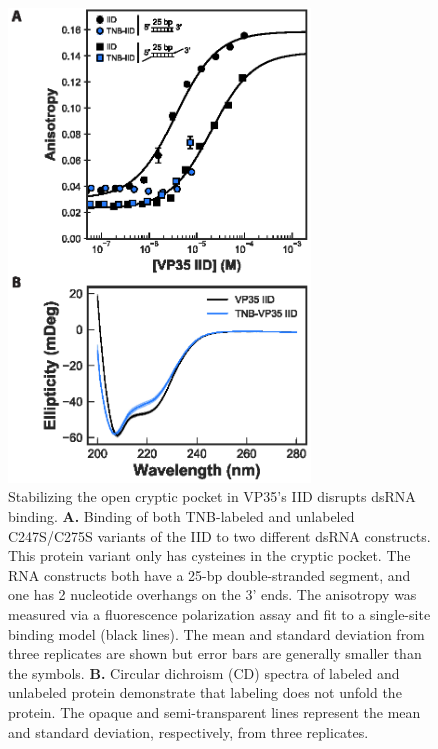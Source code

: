 \documentclass[../main.tex]{subfiles}
\begin{document}
        \begin{figure}[!htb] %
            \centering
            \includegraphics[width=3.16in]{ch5-fig5.eps}
            \caption[Stabilizing the open cryptic pocket in VP35’s IID disrupts dsRNA binding.]
                {Stabilizing the open cryptic pocket in VP35’s IID disrupts dsRNA binding. \textbf{A.} Binding of both TNB-labeled and unlabeled C247S/C275S variants of the IID to two different dsRNA constructs. This protein variant only has cysteines in the cryptic pocket. The RNA constructs both have a 25-bp double-stranded segment, and one has 2 nucleotide overhangs on the 3’ ends. The anisotropy was measured via a fluorescence polarization assay and fit to a single-site binding model (black lines). The mean and standard deviation from three replicates are shown but error bars are generally smaller than the symbols. \textbf{B.} Circular dichroism (CD) spectra of labeled and unlabeled protein demonstrate that labeling does not unfold the protein. The opaque and semi-transparent lines represent the mean and standard deviation, respectively, from three replicates.}
            \label{fig:ch5-fig5}
        \end{figure}
\end{document}
